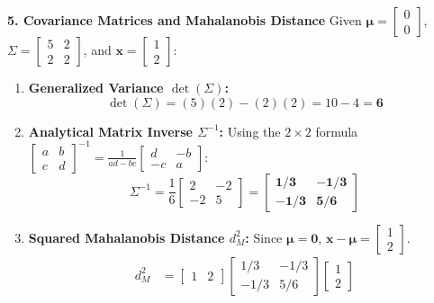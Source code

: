 \textbf{5. Covariance Matrices and Mahalanobis Distance}
Given $\boldsymbol{\mu} = \begin{bmatrix} 0 \\ 0 \end{bmatrix}$, $\Sigma = \begin{bmatrix} 5 & 2 \\ 2 & 2 \end{bmatrix}$, and $\mathbf{x} = \begin{bmatrix} 1 \\ 2 \end{bmatrix}$:
\begin{enumerate}
    \item \textbf{Generalized Variance $\det(\Sigma)$:}
    \begin{equation*}
    \det(\Sigma) = (5)(2) - (2)(2) = 10 - 4 = \mathbf{6}
    \end{equation*}
    \item \textbf{Analytical Matrix Inverse $\Sigma^{-1}$:}
    Using the $2 \times 2$ formula $\begin{bmatrix} a & b \\ c & d \end{bmatrix}^{-1} = \frac{1}{ad - bc}\begin{bmatrix} d & -b \\ -c & a \end{bmatrix}$:
    \begin{equation*}
    \Sigma^{-1} = \frac{1}{6} \begin{bmatrix} 2 & -2 \\ -2 & 5 \end{bmatrix} = \mathbf{\begin{bmatrix} 1/3 & -1/3 \\ -1/3 & 5/6 \end{bmatrix}}
    \end{equation*}
    \item \textbf{Squared Mahalanobis Distance $d_M^2$:}
    Since $\boldsymbol{\mu} = \mathbf{0}$, $\mathbf{x} - \boldsymbol{\mu} = \begin{bmatrix} 1 \\ 2 \end{bmatrix}$.
    \begin{align*}
    d_M^2 &= \begin{bmatrix} 1 & 2 \end{bmatrix} \begin{bmatrix} 1/3 & -1/3 \\ -1/3 & 5/6 \end{bmatrix} \begin{bmatrix} 1 \\ 2 \end{bmatrix} \\

\end{align*}
\end{enumerate}
